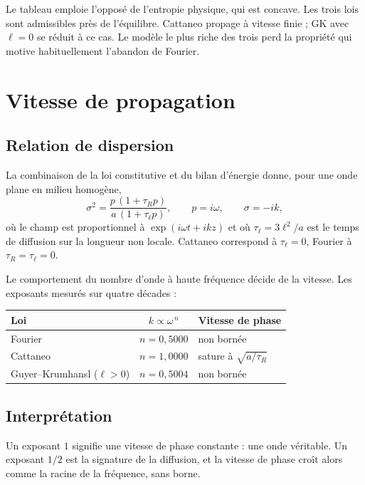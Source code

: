 \documentclass[11pt,a4paper]{article}
\begin{document}
\medskip
Le tableau emploie l'opposé de l'entropie physique, qui est concave. Les trois lois sont admissibles près de l'équilibre. Cattaneo propage à vitesse finie ; GK avec $\ell=0$ se réduit à ce cas. Le
modèle le plus riche des trois perd la propriété qui motive habituellement l'abandon de Fourier.

\section{Vitesse de propagation}

\subsection{Relation de dispersion}

La combinaison de la loi constitutive et du bilan d'énergie donne, pour une onde plane en milieu
homogène,
\[ \sigma^2 = \frac{p\,(1+\tau_R p)}{a\,(1+\tau_\ell p)} , \qquad p = i\omega , \qquad \sigma = -ik , \]
où le champ est proportionnel à $\exp(i\omega t+ikz)$ et où $\tau_\ell = 3\ell^2/a$ est le temps de diffusion sur la longueur non locale. Cattaneo correspond
à $\tau_\ell = 0$, Fourier à $\tau_R = \tau_\ell = 0$.

Le comportement du nombre d'onde à haute fréquence décide de la vitesse. Les exposants mesurés sur
quatre décades :

\begin{center}
\begin{tabular}{@{}lcl@{}}
\toprule
\textbf{Loi} & $k \propto \omega^{\,n}$ & \textbf{Vitesse de phase} \\
\midrule
Fourier & $n = 0{,}5000$ & non bornée \\
Cattaneo & $n = 1{,}0000$ & sature à $\sqrt{a/\tau_R}$ \\
Guyer--Krumhansl ($\ell>0$) & $n = 0{,}5004$ & non bornée \\
\bottomrule
\end{tabular}
\end{center}

\subsection{Interprétation}

Un exposant $1$ signifie une vitesse de phase constante : une onde véritable. Un exposant $1/2$ est
la signature de la diffusion, et la vitesse de phase croît alors comme la racine de la fréquence,
sans borne.
\end{document}
